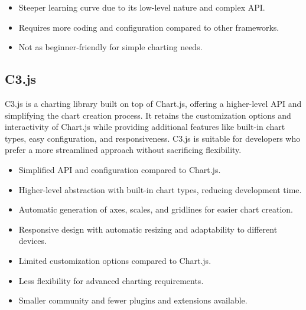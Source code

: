 \documentclass[a4paper, 11pt]{article}
\begin{document}
\medbreak
{\selectfont\large\mdseries\color{MSBlue}{ Main cons:}}
\begin{itemize}[noitemsep,nolistsep]
  \item Steeper learning curve due to its low-level nature and complex API.
  \item Requires more coding and configuration compared to other frameworks.
  \item Not as beginner-friendly for simple charting needs.
\end{itemize}

\subsection{C3.js}
C3.js is a charting library built on top of Chart.js, offering a higher-level API and simplifying the chart creation process. It retains the customization options and interactivity of Chart.js while providing additional features like built-in chart types, easy configuration, and responsiveness. C3.js is suitable for developers who prefer a more streamlined approach without sacrificing flexibility.\par
\medbreak


{\selectfont\large\mdseries\color{MSBlue}{ Main features:}}
\begin{itemize}[noitemsep,nolistsep]
  \item Simplified API and configuration compared to Chart.js.
  \item Higher-level abstraction with built-in chart types, reducing development time.
  \item Automatic generation of axes, scales, and gridlines for easier chart creation.
  \item Responsive design with automatic resizing and adaptability to different devices.
\end{itemize}\par

\medbreak
{\selectfont\large\mdseries\color{MSBlue}{ Main cons:}}
\begin{itemize}[noitemsep,nolistsep]
  \item Limited customization options compared to Chart.js.
  \item Less flexibility for advanced charting requirements.
  \item Smaller community and fewer plugins and extensions available.
\end{itemize}
\end{document}
